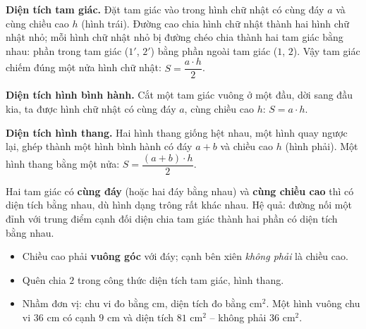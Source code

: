 \documentclass[11pt]{article}
\begin{document}
\begin{proofbox}
\textbf{Diện tích tam giác.} Đặt tam giác vào trong hình chữ nhật có cùng đáy $a$ và cùng chiều cao $h$ (hình trái). Đường cao chia hình chữ nhật thành hai hình chữ nhật nhỏ; mỗi hình chữ nhật nhỏ bị đường chéo chia thành hai tam giác bằng nhau: phần trong tam giác ($1'$, $2'$) bằng phần ngoài tam giác ($1$, $2$). Vậy tam giác chiếm đúng một nửa hình chữ nhật: $S=\dfrac{a\cdot h}{2}$.

\textbf{Diện tích hình bình hành.} Cắt một tam giác vuông ở một đầu, dời sang đầu kia, ta được hình chữ nhật có cùng đáy $a$, cùng chiều cao $h$: $S=a\cdot h$.

\textbf{Diện tích hình thang.} Hai hình thang giống hệt nhau, một hình quay ngược lại, ghép thành một hình bình hành có đáy $a+b$ và chiều cao $h$ (hình phải). Một hình thang bằng một nửa: $S=\dfrac{(a+b)\cdot h}{2}$.
\end{proofbox}

\begin{tipbox}
Hai tam giác có \textbf{cùng đáy} (hoặc hai đáy bằng nhau) và \textbf{cùng chiều cao} thì có diện tích bằng nhau, dù hình dạng trông rất khác nhau. Hệ quả: đường nối một đỉnh với trung điểm cạnh đối diện chia tam giác thành hai phần có diện tích bằng nhau.
\end{tipbox}

\begin{warnbox}
\begin{itemize}[leftmargin=1.3em,itemsep=1pt,topsep=0pt]
  \item Chiều cao phải \textbf{vuông góc} với đáy; cạnh bên xiên \emph{không phải} là chiều cao.
  \item Quên chia $2$ trong công thức diện tích tam giác, hình thang.
  \item Nhầm đơn vị: chu vi đo bằng cm, diện tích đo bằng $\text{cm}^2$. Một hình vuông chu vi $36$ cm có cạnh $9$ cm và diện tích $81\text{ cm}^2$ -- không phải $36\text{ cm}^2$.
\end{itemize}
\end{warnbox}
\end{document}
